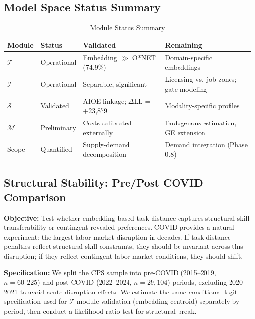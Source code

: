 \documentclass[12pt]{article}
\begin{document}
\subsection{Model Space Status Summary}
\label{subsec:model-space-status}


\begin{table}[h!]
\centering
\caption{Module Status Summary}
\label{tab:module-status}
\begin{tabular}{llll}
\toprule
\textbf{Module} & \textbf{Status} & \textbf{Validated} & \textbf{Remaining} \\
\midrule
$\mathcal{T}$ & Operational & Embedding $\gg$ O*NET (74.9\%) & Domain-specific embeddings \\
$\mathcal{I}$ & Operational & Separable, significant & Licensing vs.\ job zones; gate modeling \\
$\mathcal{S}$ & Validated & AIOE linkage; $\Delta$LL = +23,879 & Modality-specific profiles \\
$\mathcal{M}$ & Preliminary & Costs calibrated externally & Endogenous estimation; GE extension \\
Scope & Quantified & Supply-demand decomposition & Demand integration (Phase 0.8) \\
\bottomrule
\end{tabular}
\end{table}


\subsection{Structural Stability: Pre/Post COVID Comparison}
\label{subsec:covid-stability}


\textbf{Objective:} Test whether embedding-based task distance captures structural skill transferability or contingent revealed preferences. COVID provides a natural experiment: the largest labor market disruption in decades. If task-distance penalties reflect structural skill constraints, they should be invariant across this disruption; if they reflect contingent labor market conditions, they should shift.

\textbf{Specification:} We split the CPS sample into pre-COVID (2015--2019, $n = 60{,}225$) and post-COVID (2022--2024, $n = 29{,}104$) periods, excluding 2020--2021 to avoid acute disruption effects. We estimate the same conditional logit specification used for $\mathcal{T}$ module validation (embedding centroid) separately by period, then conduct a likelihood ratio test for structural break.
\end{document}
